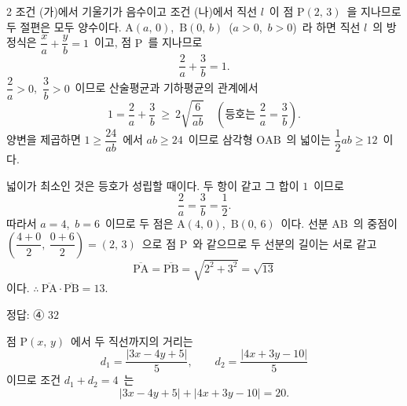 \documentclass[10pt,fleqn]{article}
\begin{document}
\begin{multicols*}{2}
조건 (가)에서 기울기가 음수이고 조건 (나)에서 직선 $l$\ 이 점 $\mathrm{P}(2,\,3)$\ 을 지나므로 두 절편은 모두 양수이다. $\mathrm{A}(a,\,0)$,\ $\mathrm{B}(0,\,b)$\ ($a>0$,\ $b>0$)\ 라 하면 직선 $l$\ 의 방정식은 $\dfrac{x}{a}+\dfrac{y}{b}=1$\ 이고, 점 $\mathrm{P}$\ 를 지나므로
$$\dfrac{2}{a}+\dfrac{3}{b}=1.$$
$\dfrac{2}{a}>0$,\ $\dfrac{3}{b}>0$\ 이므로 산술평균과 기하평균의 관계에서
$$1=\dfrac{2}{a}+\dfrac{3}{b}\ \ge\ 2\sqrt{\dfrac{6}{ab}}\quad\left(\text{등호는 }\dfrac{2}{a}=\dfrac{3}{b}\right).$$
양변을 제곱하면 $1\ge\dfrac{24}{ab}$\ 에서 $ab\ge 24$\ 이므로 삼각형 $\mathrm{OAB}$\ 의 넓이는 $\dfrac{1}{2}ab\ge 12$\ 이다.

넓이가 최소인 것은 등호가 성립할 때이다. 두 항이 같고 그 합이 $1$\ 이므로
$$\dfrac{2}{a}=\dfrac{3}{b}=\dfrac{1}{2}.$$
따라서 $a=4$,\ $b=6$\ 이므로 두 점은 $\mathrm{A}(4,\,0)$,\ $\mathrm{B}(0,\,6)$\ 이다.
선분 $\mathrm{AB}$\ 의 중점이 $\left(\dfrac{4+0}{2},\ \dfrac{0+6}{2}\right)=(2,\,3)$\ 으로 점 $\mathrm{P}$\ 와 같으므로 두 선분의 길이는 서로 같고
$$\overline{\mathrm{PA}}=\overline{\mathrm{PB}}=\sqrt{2^{2}+3^{2}}=\sqrt{13}$$
이다. $\therefore\ \overline{\mathrm{PA}}\cdot\overline{\mathrm{PB}}=13$.

\begin{dmanswerbox}
정답: ④ $32$
\end{dmanswerbox}

점 $\mathrm{P}(x,\,y)$\ 에서 두 직선까지의 거리는
$$d_{1}=\dfrac{|3x-4y+5|}{5},\qquad d_{2}=\dfrac{|4x+3y-10|}{5}$$
이므로 조건 $d_{1}+d_{2}=4$\ 는
$$|3x-4y+5|+|4x+3y-10|=20.$$


\end{multicols*}
\end{document}
